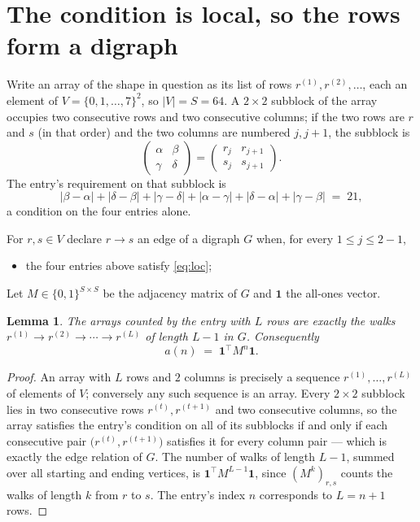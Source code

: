 \documentclass[11pt,a4paper]{article}
\theoremstyle{plain}
\newtheorem{lemma}[theorem]{Lemma}
\theoremstyle{definition}
\begin{document}
\section{The condition is local, so the rows form a digraph}

Write an array of the shape in question as its list of rows
$r^{(1)},r^{(2)},\dots$, each an element of
$V=\{0,1,\dots,7\}^{2}$, so $|V|=S=64$. A $2\times2$ subblock of the array
occupies two consecutive rows and two consecutive columns; if the two rows are $r$
and $s$ (in that order) and the two columns are numbered $j,j+1$,
the subblock is
\[
\begin{pmatrix}\alpha&\beta\\\gamma&\delta\end{pmatrix}=\begin{pmatrix}r_j&r_{j+1}\\s_j&s_{j+1}\end{pmatrix}.
\]
The entry's requirement on that subblock is
\begin{equation}\label{eq:loc}
|\beta-\alpha|+|\delta-\beta|+|\gamma-\delta|+|\alpha-\gamma|+|\delta-\alpha|+|\gamma-\beta|\;=\;21,
\end{equation}
a condition on the four entries alone.

For $r,s\in V$ declare $r\to s$ an edge of a digraph $G$ when, for every
$1\le j\le 2-1$,
\begin{itemize}
\item the four entries above satisfy \eqref{eq:loc};

\end{itemize}
Let $M\in\{0,1\}^{S\times S}$ be the adjacency matrix of $G$ and $\mathbf{1}$ the
all-ones vector.

\begin{lemma}\label{lem:walk}
The arrays counted by the entry with $L$ rows are exactly the walks
$r^{(1)}\to r^{(2)}\to\cdots\to r^{(L)}$ of length $L-1$ in $G$. Consequently
\[
a(n)\;=\;\mathbf{1}^{\!\top}M^{n}\mathbf{1} .
\]
\end{lemma}

\begin{proof}
An array with $L$ rows and $2$ columns is precisely a sequence
$r^{(1)},\dots,r^{(L)}$ of elements of $V$; conversely any such sequence is an array.
Every $2\times2$ subblock lies in two consecutive rows $r^{(t)},r^{(t+1)}$ and two
consecutive columns, so the array satisfies the entry's condition on all of its subblocks
if and only if each consecutive pair $\bigl(r^{(t)},r^{(t+1)}\bigr)$ satisfies it for
every column pair --- which is exactly the edge relation of $G$. The number of walks of
length $L-1$, summed over all starting and ending vertices, is
$\mathbf{1}^{\!\top}M^{L-1}\mathbf{1}$, since $(M^{k})_{r,s}$ counts the walks of
length $k$ from $r$ to $s$. The entry's index $n$ corresponds to $L=n+1$ rows.
\end{proof}
\end{document}
